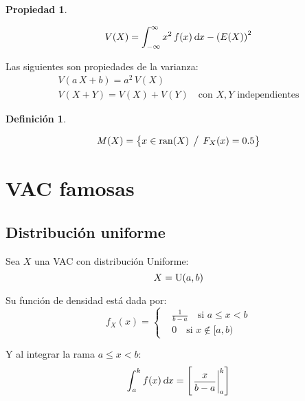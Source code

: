 \documentclass[a5paper,12pt,twoside]{book}
\newtheorem{defn}{{Definición}}[chapter]
\newtheorem{prop}{{Propiedad}}[chapter]
\begin{document}
\begin{mdframed}[style=PropertyFrame]
    \begin{prop}
    \end{prop}
    \begin{equation*}
        V(X) = \int_{-\infty}^{\infty} x^2 \, f(x) \, \textsl{d} x - \left(E(X)\right)^2
    \end{equation*}
\end{mdframed}

Las siguientes son propiedades de la varianza:
\begin{gather*}
    V(a \, X+b) = a^2 \, V(X)
    \\
    V(X+Y) = V(X) + V(Y) \quad \text{con $X, Y$ independientes}
\end{gather*}

\begin{mdframed}[style=DefinitionFrame]
    \begin{defn}
    \end{defn}
    \begin{equation*}
        M(X) = { \left\{ {x \in \operatorname{ran}(X) \hspace{1ex} \big/ \hspace{1ex} F_X(x) = 0.5} \right\} }
    \end{equation*}
\end{mdframed}


\section{VAC famosas}


\subsection{Distribución uniforme}

Sea $X$ una VAC con distribución Uniforme:
\begin{equation*}
    X = \operatorname{U}(a,b)
\end{equation*}

Su función de densidad está dada por:
\begin{equation*}
    f_X(x) =
    \left\{
    \begin{aligned}
        & \frac{1}{b-a} \quad \text{si } a \leq x < b
        \\[1ex]
        & 0 \quad \text{si } x \notin [a,b)
    \end{aligned}
    \right.
\end{equation*}

Y al integrar la rama $a \leq x < b$:
\begin{equation*}
    \int_a^k f(x) \, \textsl{d} x = \begin{bmatrix} \left. \dfrac{x}{b-a} \right|_{a}^{k} \end{bmatrix}
\end{equation*}
\end{document}
